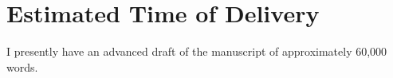 \documentclass[12pt]{article}
\begin{document}

\section{Estimated Time of Delivery} %
\label{sec:estimated_time_of_delivery}

I presently have an advanced draft of the manuscript of approximately 60,000 words.




\end{document}
